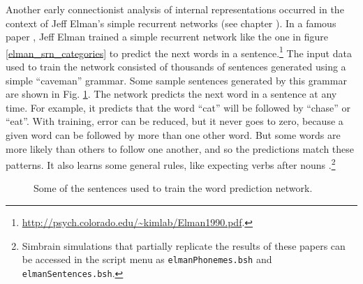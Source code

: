 
Another early connectionist analysis of internal representations occurred in the context of Jeff Elman's simple recurrent networks (see chapter ). In a famous paper \cite{elman1990finding}, Jeff Elman trained a simple recurrent network like the one in figure \ref{elman_srn_categories} to predict the next words in a sentence.\footnote{\url{http://psych.colorado.edu/~kimlab/Elman1990.pdf}.}  The input data used to train the network consisted of thousands of sentences generated using a simple ``caveman'' grammar. Some sample sentences generated by this grammar are shown in Fig. \ref{elman_sentences}. The network predicts the next word in  a sentence at any time. For example, it predicts that the word ``cat'' will be followed by ``chase'' or ``eat''. With training, error can be reduced, but it never goes to zero, because a given word can be followed by more than one other word. But some words are more likely than others to follow one another, and so the predictions match these patterns. It also learns some general rules, like expecting verbs after nouns \cite{elman1990finding}.\footnote{Simbrain simulations that partially replicate the results of these papers can be accessed in the script menu as \texttt{elmanPhonemes.bsh} and \texttt{elmanSentences.bsh}.}

\begin{figure}[h]
\centering
{}
\caption[Generated by Jeff Yoshimi based on \cite{elman1990finding}.]{Some of the sentences used to train the word prediction network.}
\label{elman_sentences}
\end{figure}

